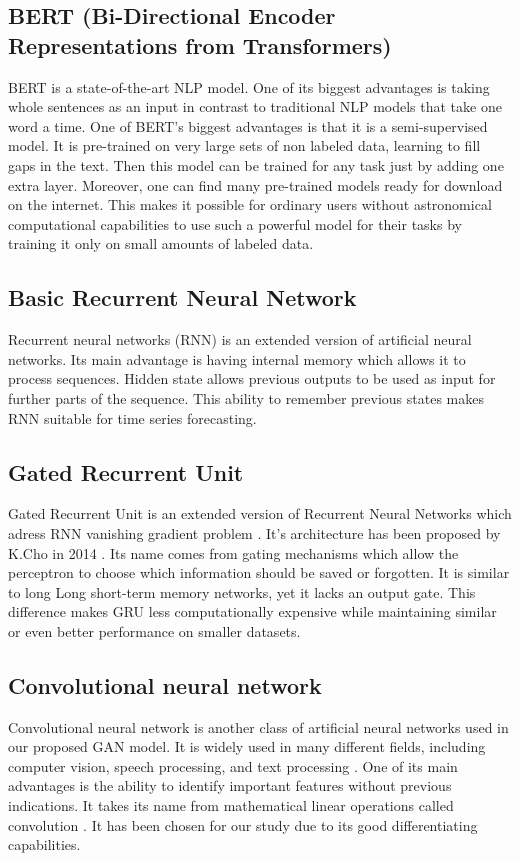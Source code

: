 \documentclass[11pt]{article} %
\begin{document}
\subsection{BERT (Bi-Directional Encoder Representations from Transformers)}
BERT is a state-of-the-art NLP model. One of its biggest advantages is taking whole sentences as an input in contrast to traditional NLP models that take one word a time. One of BERT's biggest advantages is that it is a semi-supervised model. It is pre-trained on very large sets of non labeled data, learning to fill gaps in the text. Then this model can be trained for any task just by adding one extra layer. Moreover, one can find many pre-trained models ready for download on the internet. This makes it possible for ordinary users without astronomical computational capabilities to use such a powerful model for their tasks by training it only on small amounts of labeled data. 

\subsection{Basic Recurrent Neural Network}
Recurrent neural networks (RNN) is an extended version of artificial neural networks. Its main advantage is having internal memory which allows it to process sequences. Hidden state allows previous outputs to be used as input for further parts of the sequence. This ability to remember previous states makes RNN suitable for time series forecasting. 

\subsection{Gated Recurrent Unit}
Gated Recurrent Unit is an extended version of Recurrent Neural Networks which adress RNN vanishing gradient problem \cite{gru2}.
It's architecture has been proposed by K.Cho in 2014 \cite{gru3}. Its name comes from gating mechanisms which allow the perceptron to choose which information should be saved or forgotten. It is similar to long Long short-term memory networks, yet it lacks an output gate. This difference makes GRU less computationally expensive while maintaining similar or even better performance on smaller datasets. 

\subsection{Convolutional neural network}
Convolutional neural network is another class of artificial neural networks used in our proposed GAN model. It is widely used in many different fields, including computer vision, speech processing, and text processing \cite{cnn1}. One of its main advantages is the ability to identify important features without previous indications. It takes its name from mathematical linear operations called convolution \cite{cnn2}. It has been chosen for our study due to its good differentiating capabilities.
\end{document}
